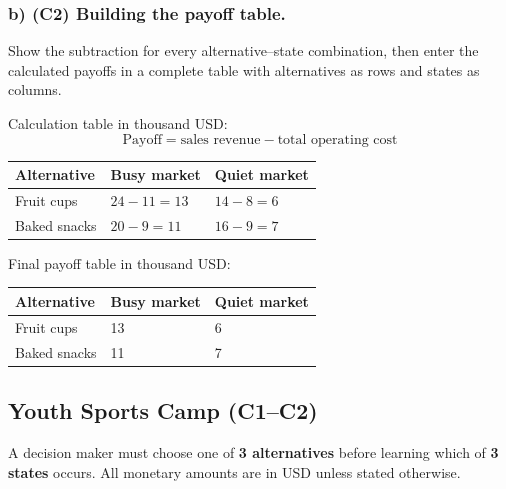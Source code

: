 \subsubsection*{b) \textbf{(C2)} Building the payoff table.}
\label{subsec:problem1-weekend-market-stall-c2}
Show the subtraction for every alternative--state combination, then enter the calculated payoffs in a complete table with alternatives as rows and states as columns.

Calculation table in thousand USD:
\[
\text{Payoff}=\text{sales revenue}-\text{total operating cost}
\]
\begin{center}
\small
\begin{tabular}{lll}
\toprule
Alternative & Busy market & Quiet market \\
\midrule
Fruit cups & $24 - 11 = 13$ & $14 - 8 = 6$ \\
Baked snacks & $20 - 9 = 11$ & $16 - 9 = 7$ \\
\bottomrule
\end{tabular}
\end{center}

Final payoff table in thousand USD:
\begin{center}
\begin{tabular}{lll}
\toprule
Alternative & Busy market & Quiet market \\
\midrule
Fruit cups & 13 & 6 \\
Baked snacks & 11 & 7 \\
\bottomrule
\end{tabular}
\end{center}
\subsection{Youth Sports Camp (C1--C2)}
\label{sec:problem2-youth-sports-camp-c1-c2}
A decision maker must choose one of \textbf{3 alternatives} before learning which of \textbf{3 states} occurs. All monetary amounts are in USD unless stated otherwise.


